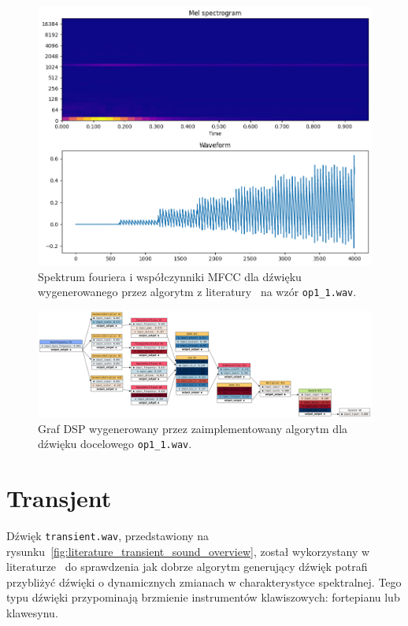 \begin{multicols}{3}
\begin{figure}[H]
    \centering
    \includegraphics[width=0.9\linewidth]{rys06/macret_evolved_op1.png}
    \caption{
      Spektrum fouriera i współczynniki MFCC dla dźwięku wygenerowanego
      przez algorytm z literatury~\cite{evolutionary_puredata} na wzór \texttt{op1\_1.wav}.
    }\label{fig:evolved_literature_op1_sound_overview}
\end{figure}
\end{multicols}

\begin{figure}[H]
    \centering
    \includegraphics[width=1.0\linewidth]{rys06/evolved_graph_op1.png}
    \caption{
      Graf DSP wygenerowany przez zaimplementowany algorytm
      dla dźwięku docelowego \texttt{op1\_1.wav}.
    }\label{fig:evolved_graph_op1}
\end{figure}

\newpage

\section{Transjent}

Dźwięk \texttt{transient.wav}, przedstawiony na rysunku~\ref{fig:literature_transient_sound_overview},
został wykorzystany w literaturze~\cite{evolutionary_puredata} do sprawdzenia jak dobrze algorytm
generujący dźwięk potrafi przybliżyć dźwięki o dynamicznych zmianach w charakterystyce spektralnej.
Tego typu dźwięki przypominają brzmienie instrumentów klawiszowych: fortepianu lub klawesynu.

